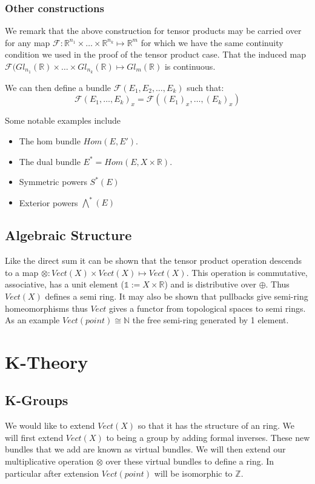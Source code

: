 \documentclass[a4paper,10pt]{article}
\theoremstyle{plain}%
\theoremstyle{definition}
\theoremstyle{remark}
\newcommand{\NN}{\mathbb{N}}
\newcommand{\ZZ}{\mathbb{Z}}
\newcommand{\RR}{\mathbb{R}}
\begin{document}
\subsubsection{Other constructions}

We remark that the above construction for tensor products may be carried over for any map $\mathcal{F}:\RR^{n_1}\times\ldots\times\RR^{n_k}\mapsto\RR^m$
for which we have the same continuity condition we used in the proof of the tensor product case.
That the induced map $\mathcal{F}(Gl_{n_1}(\RR)\times\ldots\times Gl_{n_k}(\RR)\mapsto Gl_m(\RR)$ is continuous.


We can then define a bundle $\mathcal{F}(E_1,E_2,\ldots,E_k)$ such that:
$$\mathcal{F}(E_1,\ldots,E_k)_x = \mathcal{F}((E_1)_x,\ldots,(E_k)_x)$$

Some notable examples include
\begin{itemize}
 \item The hom bundle $Hom(E,E')$.
 \item The dual bundle $E^\ast = Hom(E,X\times\RR)$.
 \item Symmetric powers $S^\ast(E)$
 \item Exterior powers $\bigwedge^\ast(E)$
\end{itemize}

\subsection{Algebraic Structure}

Like the direct sum it can be shown that the tensor product operation descends to a map 
$\otimes:Vect(X)\times Vect(X)\mapsto Vect(X)$. This operation is commutative, associative, has a unit element
($\mathbb{1}:=X\times\RR$) and is distributive over $\oplus$. Thus $Vect(X)$ defines a semi ring. It may also be shown that
pullbacks give semi-ring homeomorphisms thus $Vect$ gives a functor from topological spaces to semi rings. As an example $Vect(point)\cong\NN$ the free semi-ring generated by 1 element.


\section{K-Theory}

\subsection{K-Groups}

We would like to extend $Vect(X)$ so that it has the structure of an ring. We will first extend $Vect(X)$ to being a
group by adding formal inverses. These new bundles that we add are known as virtual bundles. We will then extend our multiplicative operation $\otimes$ over these virtual bundles to define a ring. In particular after extension $Vect(point)$ will be 
isomorphic to $\ZZ$.
\end{document}
